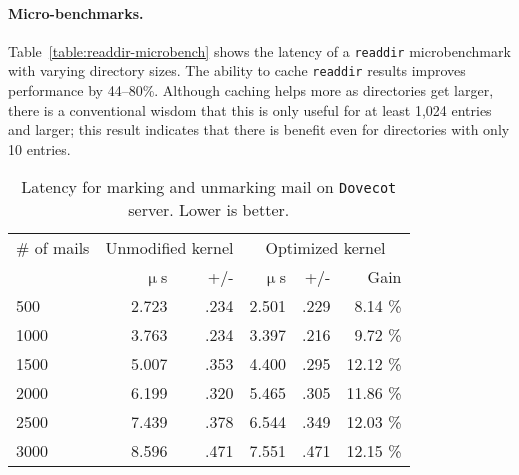 \paragraph{Micro-benchmarks.}
Table~\ref{table:readdir-microbench} shows the latency 
of a {\tt readdir} microbenchmark with varying directory sizes.
The ability to cache {\tt readdir} results improves performance by 44--80\%.
Although caching helps more as directories get larger, there is a conventional wisdom that this is only useful for at least 1,024 entries and larger;
this result indicates that there is benefit even for directories with only 10 entries.




\begin{table}[t]
\scriptsize
\centering
\begin{tabular}{|l|rr|rrr|}
\hline
\# of mails & \multicolumn{2}{c|}{Unmodified kernel} & \multicolumn{3}{c|}{Optimized kernel} \\
& $\upmu$s & +/- & $\upmu$s & +/- & Gain\\
\hline
500 & 2.723 & .234 & 2.501 & .229 & 8.14 \% \\
\hline
1000 & 3.763 & .234 & 3.397 & .216 & 9.72 \% \\
\hline
1500 & 5.007 & .353 & 4.400 & .295 & 12.12 \% \\
\hline
2000 & 6.199 & .320 & 5.465 & .305 & 11.86 \% \\
\hline
2500 & 7.439 & .378 & 6.544 & .349 & 12.03 \% \\
\hline
3000 & 8.596 & .471 & 7.551 & .471 & 12.15 \% \\
\hline
\end{tabular}
\caption{Latency for marking and unmarking mail on {\tt Dovecot} server. Lower is better.}
\label{table:dovecot}
\end{table}

